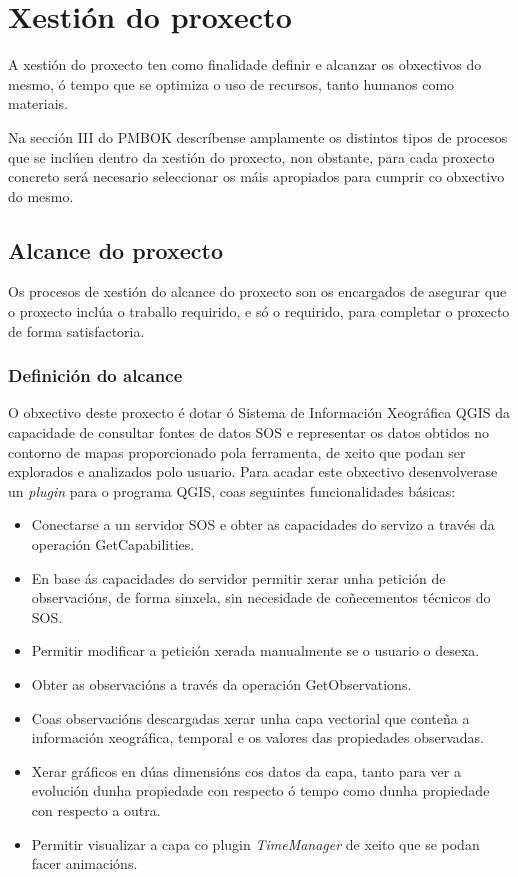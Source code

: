 \chapter{Xestión do proxecto}
A xestión do proxecto ten como finalidade definir e alcanzar os obxectivos do mesmo, ó tempo que se optimiza o uso de recursos, tanto humanos como materiais.

Na sección III do PMBOK\cite{PMBOK} descríbense amplamente os distintos tipos de procesos que se inclúen dentro da xestión do proxecto, non obstante, para cada proxecto concreto será necesario seleccionar os máis apropiados para cumprir co obxectivo do mesmo.

\section{Alcance do proxecto}
Os procesos de xestión do alcance do proxecto son os encargados de asegurar que o proxecto inclúa o traballo requirido, e só o requirido, para completar o proxecto de forma satisfactoria.

\subsection{Definición do alcance}\label{subsec:DefAlcance}
O obxectivo deste proxecto é dotar ó Sistema de Información Xeográfica QGIS da capacidade de consultar fontes de datos SOS e representar os datos obtidos no contorno de mapas proporcionado pola ferramenta, de xeito que podan ser explorados e analizados polo usuario. Para acadar este obxectivo desenvolverase un \emph{plugin} para o programa QGIS, coas seguintes funcionalidades básicas:

\begin{itemize}
\item Conectarse a un servidor SOS e obter as capacidades do servizo a través da operación GetCapabilities.
\item En base ás capacidades do servidor permitir xerar unha petición de observacións, de forma sinxela, sin necesidade de coñecementos técnicos do SOS.
\item Permitir modificar a petición xerada manualmente se o usuario o desexa.
\item Obter as observacións a través da operación GetObservations.
\item Coas observacións descargadas xerar unha capa vectorial que conteña a información xeográfica, temporal e os valores das propiedades observadas.
\item Xerar gráficos en dúas dimensións cos datos da capa, tanto para ver a evolución dunha propiedade con respecto ó tempo como dunha propiedade con respecto a outra.
\item Permitir visualizar a capa co plugin \emph{TimeManager} de xeito que se podan facer animacións.
\end{itemize}

